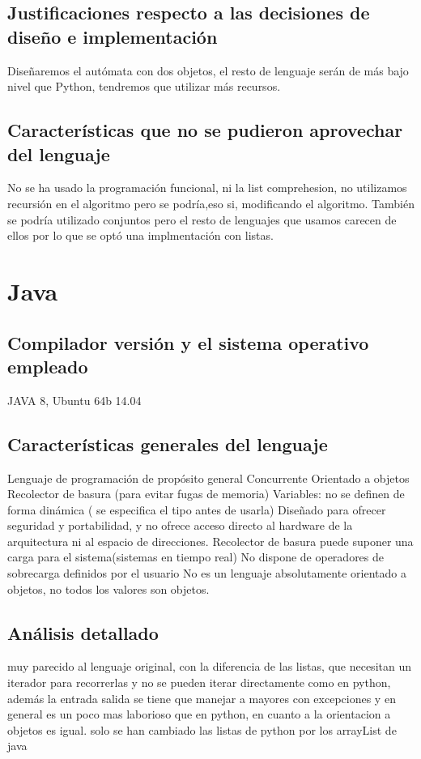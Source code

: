 \documentclass[12pt,a4paper]{article}
\begin{document}
  \subsection{Justificaciones respecto a las decisiones de diseño e implementación}
  Diseñaremos el autómata con dos objetos, el resto de lenguaje serán de más bajo nivel que Python, tendremos que utilizar más recursos.
  \subsection{Características que no se pudieron aprovechar del lenguaje}
  No se ha usado la programación funcional, ni la list comprehesion, no utilizamos recursión en el algoritmo pero se podría,eso si, modificando el algoritmo. También se podría utilizado conjuntos pero el resto de lenguajes que usamos carecen de ellos por lo que se optó una implmentación con listas.
  \section{Java}
   \subsection{Compilador versión y el sistema operativo empleado}
   JAVA 8, Ubuntu 64b 14.04
    \subsection{Características generales del lenguaje}
    Lenguaje de programación de propósito general
    Concurrente
    Orientado a objetos 
    Recolector de basura (para evitar fugas de memoria)
    Variables: no se definen de forma dinámica ( se especifica el tipo antes de usarla)
    Diseñado para ofrecer seguridad y portabilidad, y no ofrece acceso directo al hardware de la arquitectura ni al espacio de direcciones.
    Recolector de basura puede suponer una carga para el sistema(sistemas en tiempo real)
	No dispone de operadores de sobrecarga definidos por el usuario
	No es un lenguaje absolutamente orientado a objetos, no todos los valores son objetos.
	
    \subsection{Análisis detallado}
    
    muy parecido al lenguaje original, con la diferencia de las listas, que necesitan un iterador para recorrerlas y no se pueden iterar
    directamente como en python, además la entrada salida se tiene que manejar a mayores con excepciones y en general es un poco mas laborioso que
    en python, en cuanto a la orientacion a objetos es igual. solo se han cambiado las listas de python por los arrayList de java
\end{document}

